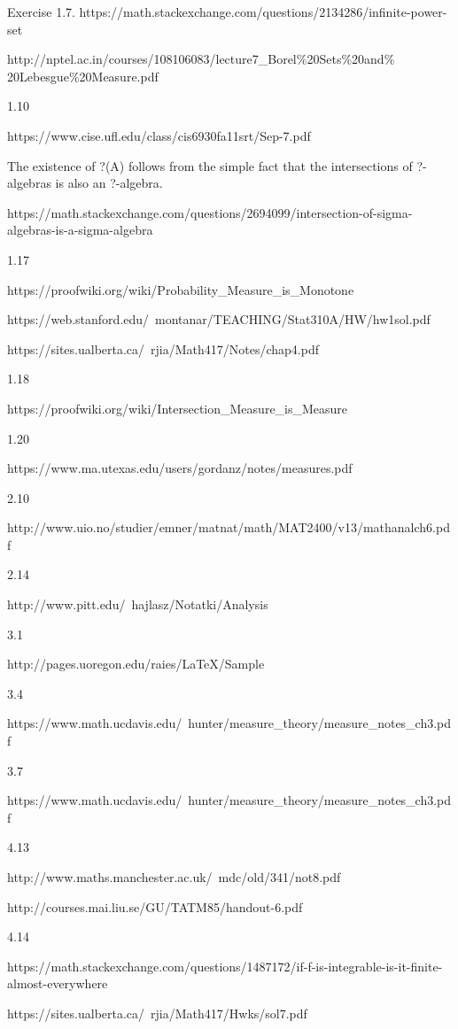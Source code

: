 \documentclass[12pt]{article}
\begin{document}




Exercise 1.7. https://math.stackexchange.com/questions/2134286/infinite-power-set

http://nptel.ac.in/courses/108106083/lecture7_Borel$\%$20Sets$\%$20and$\%$20Lebesgue$\%$20Measure.pdf

1.10

 https://www.cise.ufl.edu/class/cis6930fa11srt/Sep-7.pdf 

The existence of ?(A) follows from the simple fact that the intersections of ?-algebras is also an ?-algebra.

https://math.stackexchange.com/questions/2694099/intersection-of-sigma-algebras-is-a-sigma-algebra

1.17

https://proofwiki.org/wiki/Probability_Measure_is_Monotone

https://web.stanford.edu/~montanar/TEACHING/Stat310A/HW/hw1sol.pdf

https://sites.ualberta.ca/~rjia/Math417/Notes/chap4.pdf

1.18

https://proofwiki.org/wiki/Intersection_Measure_is_Measure

1.20

https://www.ma.utexas.edu/users/gordanz/notes/measures.pdf

2.10 

http://www.uio.no/studier/emner/matnat/math/MAT2400/v13/mathanalch6.pdf

2.14

http://www.pitt.edu/~hajlasz/Notatki/Analysis%

3.1

http://pages.uoregon.edu/raies/LaTeX/Sample%

3.4

https://www.math.ucdavis.edu/~hunter/measure_theory/measure_notes_ch3.pdf

3.7 

https://www.math.ucdavis.edu/~hunter/measure_theory/measure_notes_ch3.pdf

4.13 

http://www.maths.manchester.ac.uk/~mdc/old/341/not8.pdf

http://courses.mai.liu.se/GU/TATM85/handout-6.pdf

4.14

https://math.stackexchange.com/questions/1487172/if-f-is-integrable-is-it-finite-almost-everywhere

https://sites.ualberta.ca/~rjia/Math417/Hwks/sol7.pdf
\end{document}
